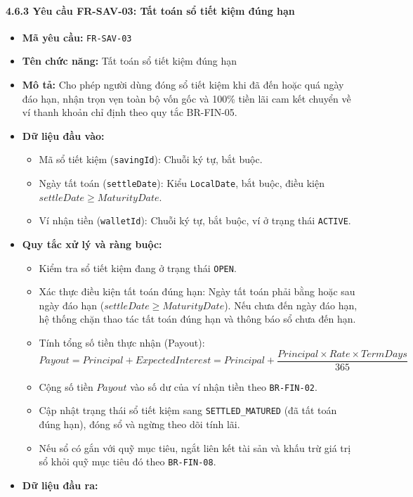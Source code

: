 \documentclass[11pt,a4paper]{article}
\providecommand{\tightlist}{
  \setlength{\itemsep}{0pt}\setlength{\parskip}{0pt}}
\begin{document}
\paragraph{4.6.3 Yêu cầu FR-SAV-03: Tất toán sổ tiết kiệm đúng
hạn}\label{463-yuxeau-cux1ea7u-fr-sav-03-tux1ea5t-touxe1n-sux1ed5-tiux1ebft-kiux1ec7m-ux111uxfang-hux1ea1n}

\begin{itemize}
\tightlist
\item
  \textbf{Mã yêu cầu:} \texttt{FR-SAV-03}
\item
  \textbf{Tên chức năng:} Tất toán sổ tiết kiệm đúng hạn
\item
  \textbf{Mô tả:} Cho phép người dùng đóng sổ tiết kiệm khi đã đến hoặc
  quá ngày đáo hạn, nhận trọn vẹn toàn bộ vốn gốc và 100\% tiền lãi cam
  kết chuyển về ví thanh khoản chỉ định theo quy tắc BR-FIN-05.
\item
  \textbf{Dữ liệu đầu vào:}

  \begin{itemize}
  \tightlist
  \item
    Mã sổ tiết kiệm (\texttt{savingId}): Chuỗi ký tự, bắt buộc.
  \item
    Ngày tất toán (\texttt{settleDate}): Kiểu \texttt{LocalDate}, bắt
    buộc, điều kiện \(settleDate \ge MaturityDate\).
  \item
    Ví nhận tiền (\texttt{walletId}): Chuỗi ký tự, bắt buộc, ví ở trạng
    thái \texttt{ACTIVE}.
  \end{itemize}
\item
  \textbf{Quy tắc xử lý và ràng buộc:}

  \begin{itemize}
  \tightlist
  \item
    Kiểm tra sổ tiết kiệm đang ở trạng thái \texttt{OPEN}.
  \item
    Xác thực điều kiện tất toán đúng hạn: Ngày tất toán phải bằng hoặc
    sau ngày đáo hạn (\(settleDate \ge MaturityDate\)). Nếu chưa đến
    ngày đáo hạn, hệ thống chặn thao tác tất toán đúng hạn và thông báo
    sổ chưa đến hạn.
  \item
    Tính tổng số tiền thực nhận (Payout):
    \[Payout = Principal + ExpectedInterest = Principal + \frac{Principal \times Rate \times TermDays}{365}\]
  \item
    Cộng số tiền \(Payout\) vào số dư của ví nhận tiền theo
    \texttt{BR-FIN-02}.
  \item
    Cập nhật trạng thái sổ tiết kiệm sang \texttt{SETTLED\_MATURED} (đã
    tất toán đúng hạn), đóng sổ và ngừng theo dõi tính lãi.
  \item
    Nếu sổ có gắn với quỹ mục tiêu, ngắt liên kết tài sản và khấu trừ
    giá trị sổ khỏi quỹ mục tiêu đó theo \texttt{BR-FIN-08}.
  \end{itemize}
\item
  \textbf{Dữ liệu đầu ra:}


\end{itemize}
\end{document}
